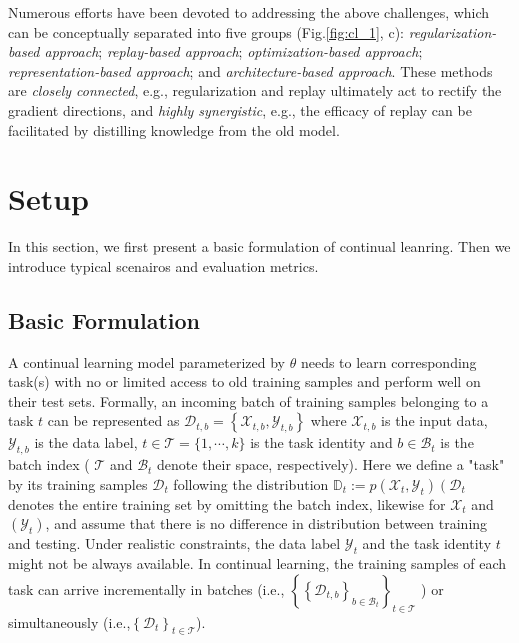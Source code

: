 Numerous efforts have been devoted to addressing the above challenges, which can be conceptually separated into five groups (Fig.\ref{fig:cl_1}, c): \textit{regularization-based approach}; \textit{replay-based approach}; \textit{optimization-based approach}; \textit{representation-based approach}; and \textit{architecture-based approach}. These methods are \textit{closely connected}, e.g., regularization and replay ultimately act to rectify the gradient directions, and \textit{highly synergistic}, e.g., the efficacy of replay can be facilitated by distilling knowledge from the old model.

\section{Setup}
In this section, we first present a basic formulation of continual leanring. Then we introduce typical scenairos and evaluation metrics.

\subsection{Basic Formulation}
A continual learning model parameterized by \(\theta\) needs to learn corresponding task(s) with no or limited access to old training samples and perform well on their test sets. Formally, an incoming batch of training samples belonging to a task \(t\) can be represented as \(\mathcal{D}_{t, b}=\left\{\mathcal{X}_{t, b}, \mathcal{Y}_{t, b}\right\}\) where \(\mathcal{X}_{t, b}\) is the input data, \(\mathcal{Y}_{t, b}\) is the data label, \(t \in \mathcal{T}=\{1, \cdots, k\}\) is the task identity and \(b \in \mathcal{B}_{t}\) is the batch index ( \(\mathcal{T}\) and \(\mathcal{B}_{t}\) denote their space, respectively). Here we define a "task" by its training samples \(\mathcal{D}_{t}\) following the distribution \(\mathbb{D}_{t}:=p\left(\mathcal{X}_{t}, \mathcal{Y}_{t}\right)\left(\mathcal{D}_{t}\right.\) denotes the entire training set by omitting the batch index, likewise for \(\mathcal{X}_{t}\) and \(\left( \mathcal{Y}_{t}\right)\), and assume that there is no difference in distribution between training and testing. Under realistic constraints, the data label \(\mathcal{Y}_{t}\) and the task identity \(t\) might not be always available. In continual learning, the training samples of each task can arrive incrementally in batches (i.e., \(\left\{\left\{\mathcal{D}_{t, b}\right\}_{b \in \mathcal{B}_{t}}\right\}_{t \in \mathcal{T}}\) ) or simultaneously (i.e.,\(\left\{\mathcal{D}_{t}\right\}_{t \in \mathcal{T}}\)).

